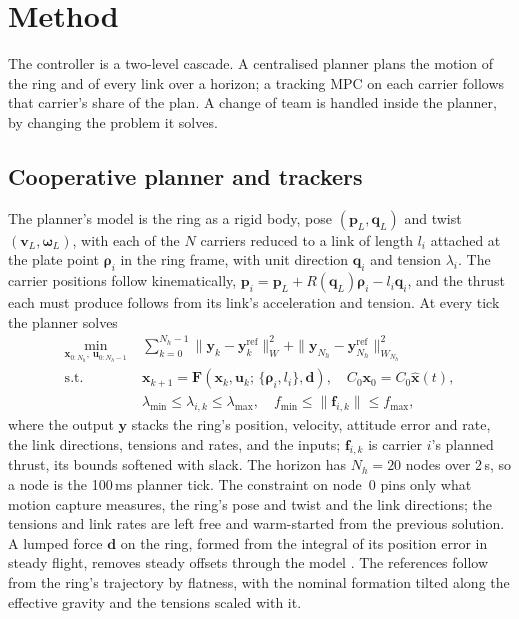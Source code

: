 \section{Method}
\label{sec:method}

The controller is a two-level cascade. A centralised planner plans the motion of the ring and of every link over a
horizon; a tracking MPC on each carrier follows that carrier's share of the plan. A change of team is handled
inside the planner, by changing the problem it solves.

\subsection{Cooperative planner and trackers}
\label{sec:planner}

The planner's model is the ring as a rigid body, pose $(\mathbf{p}_L, \mathbf{q}_L)$ and twist $(\mathbf{v}_L,
\boldsymbol{\omega}_L)$, with each of the $N$ carriers reduced to a link of length $l_i$ attached at the plate
point $\boldsymbol{\rho}_i$ in the ring frame, with unit direction $\mathbf{q}_i$ and tension $\lambda_i$. The
carrier positions follow kinematically, $\mathbf{p}_i = \mathbf{p}_L + R(\mathbf{q}_L)\boldsymbol{\rho}_i -
l_i\mathbf{q}_i$, and the thrust each must produce follows from its link's acceleration and tension. At every
tick the planner solves
\begin{equation}
\begin{aligned}
  \min_{\mathbf{x}_{0:N_h},\,\mathbf{u}_{0:N_h-1}} \;& \sum_{k=0}^{N_h-1} \|\mathbf{y}_k - \mathbf{y}_k^{\mathrm{ref}}\|_W^2
    + \|\mathbf{y}_{N_h} - \mathbf{y}_{N_h}^{\mathrm{ref}}\|_{W_{N_h}}^2 \\
  \text{s.t.}\;& \mathbf{x}_{k+1} = \mathbf{F}(\mathbf{x}_k, \mathbf{u}_k;\, \{\boldsymbol{\rho}_i, l_i\}, \mathbf{d}),
    \quad C_0\mathbf{x}_0 = C_0\hat{\mathbf{x}}(t), \\
  & \lambda_{\min} \le \lambda_{i,k} \le \lambda_{\max}, \quad f_{\min} \le \|\mathbf{f}_{i,k}\| \le f_{\max},
\end{aligned}
\label{eq:ocp}
\end{equation}
where the output $\mathbf{y}$ stacks the ring's position, velocity, attitude error and rate, the link directions,
tensions and rates, and the inputs; $\mathbf{f}_{i,k}$ is carrier $i$'s planned thrust, its bounds softened with
slack. The horizon has $N_h = 20$ nodes over 2\,s, so a node is the 100\,ms planner tick. The constraint on node~0
pins only what motion capture measures, the ring's pose and twist and the link directions; the tensions and link
rates are left free and warm-started from the previous solution. A lumped force $\mathbf{d}$ on the ring, formed
from the integral of its position error in steady flight, removes steady offsets through the model
\cite{pannocchia2003disturbance, maeder2009linear}. The references follow from the ring's trajectory by flatness,
with the nominal formation tilted along the effective gravity and the tensions scaled with it.

